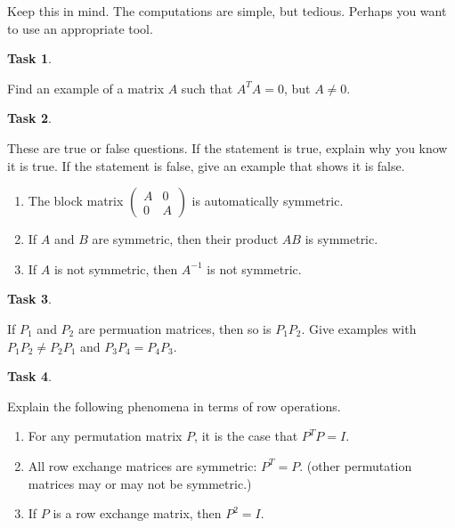 \documentclass[10pt,]{book}
\theoremstyle{plain}
\theoremstyle{definition}
\numberwithin{equation}{section}
\newtheorem{task}{Task}[chapter]
\begin{document}
      Keep this in mind. The computations are simple, but tedious.
      Perhaps you want to use an appropriate tool.
\begin{task}
\label{task-76}

        Find an example of a matrix \(A\) such that \(A^T A = 0\),
        but \(A \neq 0\).
      \end{task}
\begin{task}
\label{task-77}

        These are true or false questions. If the statement is true, explain why
        you know it is true. If the statement is false, give an example that
        shows it is false.
        \begin{enumerate}
\item{}
            The block matrix \(\left( \begin{smallmatrix} A & 0 \\
            0 & A \end{smallmatrix}\right)\) is automatically symmetric.
          \item{}
            If \(A\) and \(B\) are symmetric, then their product \(AB\)
            is symmetric.
          \item{}
            If \(A\) is not symmetric, then \(A^{-1}\) is not symmetric.
          \end{enumerate}
\end{task}
\begin{task}
\label{task-78}

        If \(P_1\) and \(P_2\) are permuation matrices, then so is
        \(P_1P_2\). Give examples with \(P_1P_2 \neq P_2P_1\) and
        \(P_3P_4 = P_4P_3\).
      \end{task}
\begin{task}
\label{task-79}

        Explain the following phenomena in terms of row operations.
        \begin{enumerate}
\item{}
            For any permutation matrix \(P\), it is the case that
            \(P^T P = I\).
          \item{}
            All row exchange matrices are symmetric: \(P^T = P\).
            (other permutation matrices may or may not be symmetric.)
          \item{}
            If \(P\) is a row exchange matrix, then \(P^2 = I\).
          \end{enumerate}
\end{task}
\end{document}
